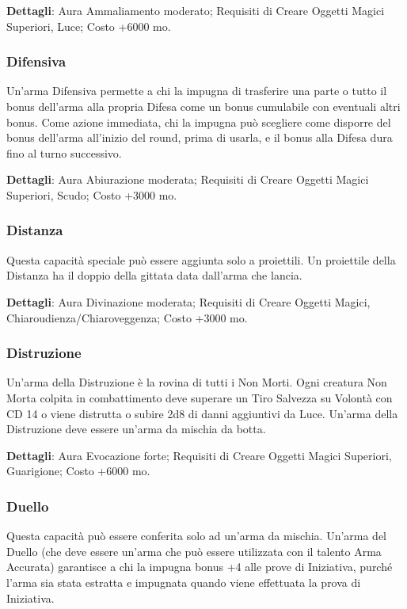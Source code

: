 \begin{multicols}{2}
\textbf{Dettagli}: Aura Ammaliamento moderato; Requisiti di Creare Oggetti Magici Superiori, Luce; Costo +6000 mo.

\subsubsection{Difensiva}

Un'arma Difensiva permette a chi la impugna di trasferire una parte o tutto il bonus dell'arma alla propria Difesa come un bonus cumulabile con eventuali altri bonus. Come azione immediata, chi la impugna può scegliere come disporre del bonus dell'arma all'inizio del round, prima di usarla, e il bonus alla Difesa dura fino al turno successivo.

\textbf{Dettagli}: Aura Abiurazione moderata; Requisiti di Creare Oggetti Magici Superiori, Scudo; Costo +3000 mo.

\subsubsection{Distanza}

Questa capacità speciale può essere aggiunta solo a proiettili. Un proiettile della Distanza ha il doppio della gittata data dall'arma che lancia.

\textbf{Dettagli}: Aura Divinazione moderata; Requisiti di Creare Oggetti Magici, Chiaroudienza/Chiaroveggenza; Costo +3000 mo.


\subsubsection{Distruzione}

Un'arma della Distruzione è la rovina di tutti i Non Morti. Ogni creatura Non Morta colpita in combattimento deve superare un Tiro Salvezza su Volontà con CD 14 o viene distrutta o subire 2d8 di danni aggiuntivi da Luce. Un'arma della Distruzione deve essere un'arma da mischia da botta.

\textbf{Dettagli}: Aura Evocazione forte; Requisiti di Creare Oggetti Magici Superiori, Guarigione; Costo +6000 mo.

\subsubsection{Duello}

Questa capacità può essere conferita solo ad un'arma da mischia. Un'arma del Duello (che deve essere un'arma che può essere utilizzata con il talento Arma Accurata) garantisce a chi la impugna bonus +4 alle prove di Iniziativa, purché l'arma sia stata estratta e impugnata quando viene effettuata la prova di Iniziativa. 


\end{multicols}
